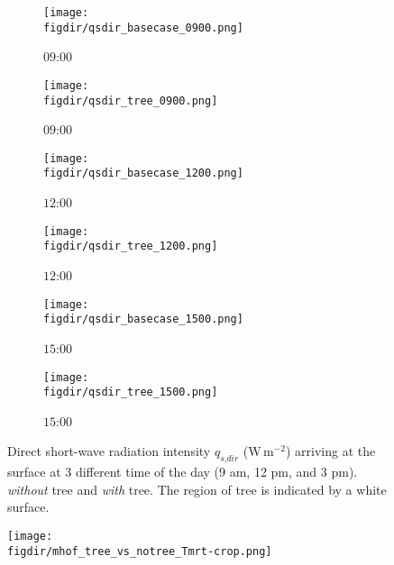 \begin{figure}[p]
	\centering
	\begin{subfigure}[b]{.45\linewidth}
		\texttt{[image: \\figdir/qsdir\_basecase\_0900.png]}
		\caption{$09$:$00$}\label{fig:qrdir_basecase_0900}
	\end{subfigure}\hspace*{\fill}
	\begin{subfigure}[b]{.45\linewidth}
		\texttt{[image: \\figdir/qsdir\_tree\_0900.png]}
		\caption{$09$:$00$}\label{fig:qrdir_tree_0900}
	\end{subfigure}
	
	\medskip
	\begin{subfigure}[b]{.45\linewidth}
		\texttt{[image: \\figdir/qsdir\_basecase\_1200.png]}
		\caption{$12$:$00$}\label{fig:qsdir_basecase_1200}
	\end{subfigure}\hspace*{\fill}
	\begin{subfigure}[b]{.45\linewidth}
		\texttt{[image: \\figdir/qsdir\_tree\_1200.png]}
		\caption{$12$:$00$}\label{fig:qsdir_tree_1200}
	\end{subfigure}
	
	\medskip
	\begin{subfigure}[b]{.45\linewidth}
		\texttt{[image: \\figdir/qsdir\_basecase\_1500.png]}
		\caption{$15$:$00$}\label{fig:qsdir_basecase_1500}
	\end{subfigure}\hspace*{\fill}
	\begin{subfigure}[b]{.45\linewidth}
		\texttt{[image: \\figdir/qsdir\_tree\_1500.png]}
		\caption{$15$:$00$}\label{fig:qsdir_tree_1500}
	\end{subfigure}
	
	\caption{Direct short-wave radiation intensity $q_{\textit{s,dir}}$ (W\,m$^{-2}$) arriving at the surface at 3 different time of the day (9 am, 12 pm, and 3 pm).  \textit{without} tree and  \textit{with} tree. The region of tree is indicated by a white surface. }
	\label{fig:qsdir_muensterhof}	
\end{figure}

	
	\begin{figure}[p]
		\centering
		\texttt{[image: \\figdir/mhof\_tree\_vs\_notree\_Tmrt-crop.png]}
		\caption{}
		\label{fig:Tmrtdiff_muensterhof}
	\end{figure}


